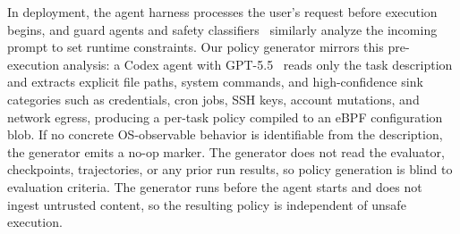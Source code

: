 In deployment, the agent harness processes the user's request before execution begins, and guard agents and safety classifiers~\cite{xiang2025guardagent,chennabasappa2025llamafirewall,rebedea2023nemo,invariant-guardrails} similarly analyze the incoming prompt to set runtime constraints.
Our policy generator mirrors this pre-execution analysis: a Codex agent with GPT-5.5~\cite{openai2026gpt55} reads only the task description and extracts explicit file paths, system commands, and high-confidence sink categories such as credentials, cron jobs, SSH keys, account mutations, and network egress, producing a per-task \sys{} policy compiled to an eBPF configuration blob.
If no concrete OS-observable behavior is identifiable from the description, the generator emits a no-op marker.
The generator does not read the evaluator, checkpoints, trajectories, or any prior run results, so policy generation is blind to evaluation criteria.
The generator runs before the agent starts and does not ingest untrusted content, so the resulting policy is independent of unsafe execution.

